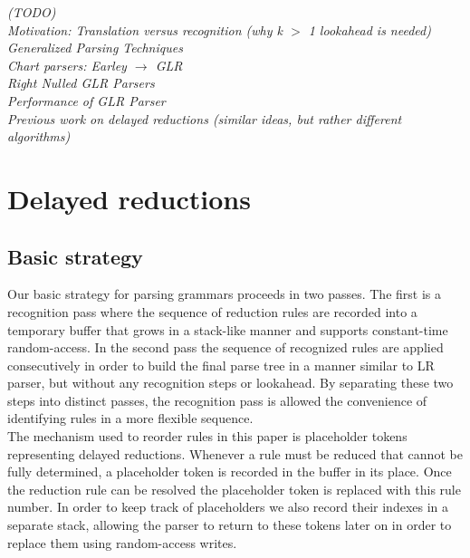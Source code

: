 \documentclass[11pt]{article}
\begin{document}
\emph{(TODO)\\ %
Motivation: Translation versus recognition (why k $>$ 1 lookahead is needed) \cite{Parr95lland}\\
Generalized Parsing Techniques \cite{Thurston07}\\
Chart parsers: Earley $\rightarrow$ GLR \\
Right Nulled GLR Parsers \cite{1146810}\\
Performance of GLR Parser \cite{Mcpeak04elkhound:a}\\ %
Previous work on delayed reductions (similar ideas, but rather different algorithms) \cite{1287949, Marc80, 991520, 146993}
}

\section{Delayed reductions}

\subsection{Basic strategy}
Our basic strategy for parsing grammars proceeds in two passes.
The first is a recognition pass where the sequence of reduction rules are recorded into a temporary buffer that grows in a stack-like manner and supports constant-time random-access.
In the second pass the sequence of recognized rules are applied consecutively in order to build the final parse tree in a manner similar to LR parser, but without any recognition steps or lookahead.
By separating these two steps into distinct passes, the recognition pass is allowed the convenience of identifying rules in a more flexible sequence.\\

The mechanism used to reorder rules in this paper is placeholder tokens representing delayed reductions.
Whenever a rule must be reduced that cannot be fully determined, a placeholder token is recorded in the buffer in its place. 
Once the reduction rule can be resolved the placeholder token is replaced with this rule number.
In order to keep track of placeholders we also record their indexes in a separate stack, allowing the parser to return to these tokens later on in order to replace them using random-access writes.\\
\end{document}
